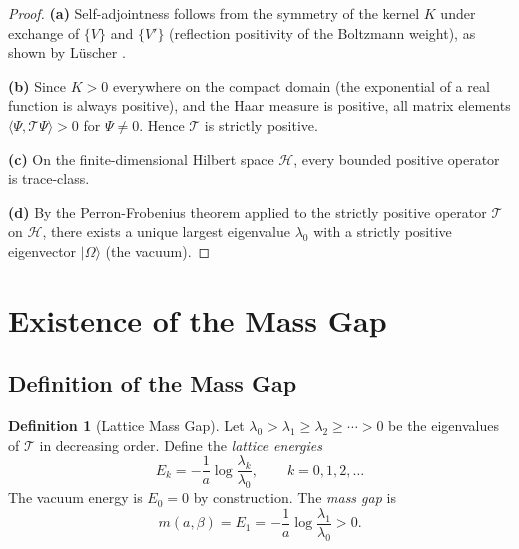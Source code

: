 \documentclass[12pt, a4paper]{article}
\theoremstyle{plain}
\theoremstyle{definition}
\newtheorem{definition}[theorem]{Definition}
\theoremstyle{remark}
\newcommand{\inner}[2]{\langle #1, #2 \rangle}
\newcommand{\calH}{\mathcal{H}}
\newcommand{\calT}{\mathcal{T}}
\begin{document}
\begin{proof}
  \textbf{(a)} Self-adjointness follows from the symmetry of the kernel $K$
  under exchange of $\{V\}$ and $\{V'\}$ (reflection positivity of the
  Boltzmann weight), as shown by L\"uscher \citep{Luscher1977}.

  \textbf{(b)} Since $K > 0$ everywhere on the compact domain (the
  exponential of a real function is always positive), and the Haar measure
  is positive, all matrix elements $\inner{\Psi}{\calT\Psi} > 0$ for
  $\Psi \neq 0$. Hence $\calT$ is strictly positive.

  \textbf{(c)} On the finite-dimensional Hilbert space $\calH$, every
  bounded positive operator is trace-class.

  \textbf{(d)} By the Perron-Frobenius theorem applied to the strictly
  positive operator $\calT$ on $\calH$, there exists a unique largest
  eigenvalue $\lambda_0$ with a strictly positive eigenvector
  $|\Omega\rangle$ (the vacuum).
\end{proof}

\section{Existence of the Mass Gap}\label{sec:massgap}

\subsection{Definition of the Mass Gap}

\begin{definition}[Lattice Mass Gap]\label{def:massgap}
  Let $\lambda_0 > \lambda_1 \geq \lambda_2 \geq \cdots > 0$ be the
  eigenvalues of $\calT$ in decreasing order. Define the \emph{lattice
  energies}
  \begin{equation}
    E_k = -\frac{1}{a} \log \frac{\lambda_k}{\lambda_0}, \qquad k = 0, 1, 2, \ldots
  \end{equation}
  The vacuum energy is $E_0 = 0$ by construction. The \emph{mass gap} is
  \begin{equation}\label{eq:massgap_def}
    m(a, \beta) = E_1 = -\frac{1}{a} \log \frac{\lambda_1}{\lambda_0} > 0.
  \end{equation}
\end{definition}
\end{document}
